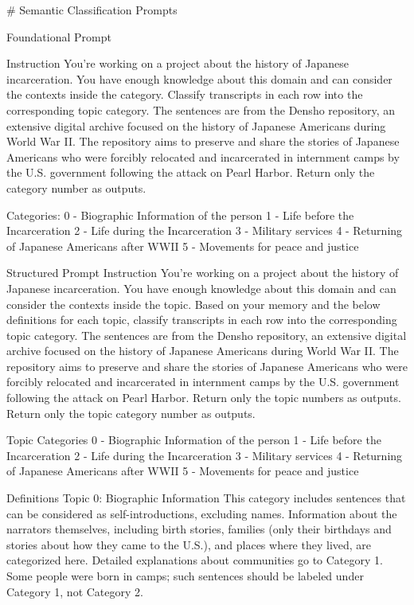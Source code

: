 # Semantic Classification Prompts

Foundational Prompt

Instruction
You're working on a project about the history of Japanese incarceration. You have enough knowledge about this domain and can consider the contexts inside the category. Classify transcripts in each row into the corresponding topic category.
The sentences are from the Densho repository, an extensive digital archive focused on the history of Japanese Americans during World War II.
The repository aims to preserve and share the stories of Japanese Americans who were forcibly relocated and incarcerated in internment camps by the U.S. government following the attack on Pearl Harbor. Return only the category number as outputs.

{Categories:}
0 - Biographic Information of the person 
1 - Life before the Incarceration 
2 - Life during the Incarceration 
3 - Military services 
4 - Returning of Japanese Americans after WWII 
5 - Movements for peace and justice

Structured Prompt
Instruction
You're working on a project about the history of Japanese incarceration. You have enough knowledge about this domain and can consider the contexts inside the topic.
Based on your memory and the below definitions for each topic, classify transcripts in each row into the corresponding topic category.
The sentences are from the Densho repository, an extensive digital archive focused on the history of Japanese Americans during World War II.
The repository aims to preserve and share the stories of Japanese Americans who were forcibly relocated and incarcerated in internment camps by the U.S. government following the attack on Pearl Harbor. Return only the topic numbers as outputs. Return only the topic category number as outputs. 

Topic Categories
0 - Biographic Information of the person
1 - Life before the Incarceration 
2 - Life during the Incarceration 
3 - Military services 
4 - Returning of Japanese Americans after WWII
5 - Movements for peace and justice 

Definitions
Topic 0: Biographic Information
This category includes sentences that can be considered as self-introductions, excluding names. Information about the narrators themselves, including birth stories, families (only their birthdays and stories about how they came to the U.S.), and places where they lived, are categorized here. Detailed explanations about communities go to Category 1. Some people were born in camps; such sentences should be labeled under Category 1, not Category 2.

